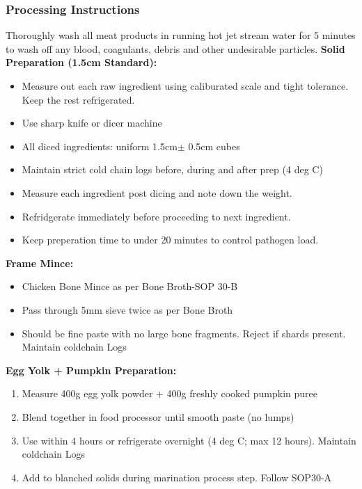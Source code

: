 \subsubsection*{Processing Instructions}
\item Thoroughly wash all meat products in running hot jet stream water for 5 minutes to wash off any blood, coagulants, debris and other undesirable particles. 
\textbf{Solid Preparation (1.5cm Standard):}
\begin{itemize}
\item Measure out each raw ingredient using caliburated scale and tight tolerance. Keep the rest refrigerated.
\item Use sharp knife or dicer machine
\item All diced ingredients: uniform 1.5cm$\pm$ 0.5cm cubes
\item Maintain strict cold chain logs before, during and after prep (4 deg C)
\item Measure each ingredient post dicing and note down the weight. 
\item Refridgerate immediately before proceeding to next ingredient. 
\item Keep preperation time to under 20 minutes to control pathogen load. 

\end{itemize}
\textbf{Frame Mince:}
\begin{itemize}
\item Chicken Bone Mince as per Bone Broth-SOP 30-B
\item Pass through 5mm sieve twice as per Bone Broth 
\item Should be fine paste with no large bone fragments. Reject if shards present. Maintain coldchain Logs
\end{itemize}
\textbf{Egg Yolk + Pumpkin Preparation:}
\begin{enumerate}
\item Measure 400g egg yolk powder + 400g freshly cooked pumpkin puree
\item Blend together in food processor until smooth paste (no lumps)
\item Use within 4 hours or refrigerate overnight (4 deg C; max 12 hours). Maintain coldchain Logs
\item Add to blanched solids during marination process step. Follow SOP30-A
\end{enumerate}

